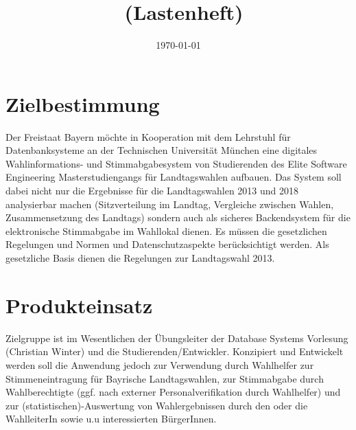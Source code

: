 \documentclass[a4paper,12pt]{article}
\title{\projektName~(Lastenheft)}
\author{\authorName}
\date{\today}
\begin{document}
 \setcounter{page}{2}
 \tableofcontents          %
 \clearpage
 
\section{Zielbestimmung}
Der Freistaat Bayern möchte in Kooperation mit dem Lehrstuhl für Datenbanksysteme an der Technischen Universität München
eine digitales Wahlinformations- und Stimmabgabesystem von Studierenden des Elite Software Engineering Masterstudiengangs 
für Landtagswahlen aufbauen.
Das System soll dabei nicht nur die Ergebnisse für die Landtagswahlen 2013 und 2018 analysierbar machen (Sitzverteilung im
Landtag, Vergleiche zwischen Wahlen, Zusammensetzung des Landtags) sondern auch als sicheres Backendsystem für die
elektronische Stimmabgabe im Wahllokal dienen. Es müssen die gesetzlichen Regelungen und Normen und Datenschutzaspekte
berücksichtigt werden. Als gesetzliche Basis dienen die Regelungen zur Landtagswahl 2013.

\section{Produkteinsatz}
Zielgruppe ist im Wesentlichen der Übungsleiter der Database Systems Vorlesung
(Christian Winter) und die Studierenden/Entwickler. Konzipiert und Entwickelt
werden soll die Anwendung jedoch zur Verwendung durch Wahlhelfer zur 
Stimmeneintragung für Bayrische Landtagswahlen, zur Stimmabgabe durch Wahlberechtigte
(ggf. nach externer Personalverifikation durch Wahlhelfer) und zur (statistischen)-Auswertung
von Wahlergebnissen durch den oder die WahlleiterIn sowie u.u interessierten BürgerInnen.
\end{document}
